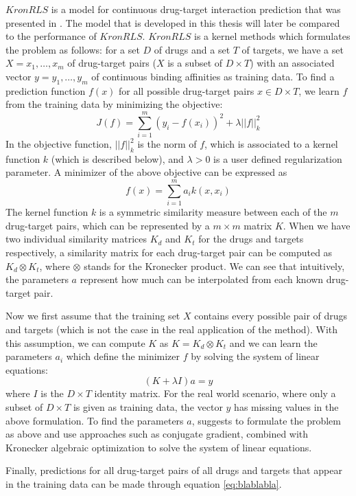 $KronRLS$ is a model for continuous drug-target interaction prediction that was presented in \cite{pahikkala2014toward}. The model that is developed in this thesis will later be compared to the performance of $KronRLS$. $KronRLS$ is a kernel methods which formulates the problem as follows:
for a set $D$ of drugs and a set $T$ of targets, we have a set $X = x_1,\dots,x_m$ of drug-target pairs ($X$ is a subset of $D\times T$) with an associated vector $y = y_1,\dots,y_m$ of continuous binding affinities as training data. To find a prediction function $f(x)$ for all possible drug-target pairs $x \in D\times T$, we learn $f$ from the training data by minimizing the objective:
\begin{equation}
J(f) = \sum\limits_{i=1}^{m}(y_i-f(x_i))^2 + \lambda ||f||_k^2
\end{equation}
In the objective function, $||f||_k^2$ is the norm of $f$, which is associated to a kernel function $k$ (which is described below), and $\lambda>0$ is a user defined regularization parameter. A minimizer of the above objective can be expressed as 
\begin{equation}
\label{eq:blablabla}
f(x)=\sum\limits_{i=1}^
{m} a_i k(x,x_i)
\end{equation}
The kernel function $k$ is a symmetric similarity measure between each of the $m$ drug-target pairs, which can be represented by a $m \times m$ matrix $K$. When we have two individual similarity matrices $K_d$ and $K_t$ for the drugs and targets respectively, a similarity matrix for each drug-target pair can be computed as \mbox{$K_d \otimes K_t$}, where $\otimes$ stands for the Kronecker product. We can see that intuitively, the parameters $a$ represent how much can be interpolated from each known drug-target pair.

Now we first assume that the training set $X$ contains every possible pair of drugs and targets (which is not the case in the real application of the method). With this assumption, we can compute $K$ as \mbox{$K = K_d \otimes K_t$} and we can learn the parameters $a_i$ which define the minimizer $f$ by solving the system of linear equations:
\begin{equation}
(K+\lambda I)a = y
\end{equation} where $I$ is the $D\times T$ identity matrix. 
For the real world scenario, where only a subset of $D\times T$ is given as training data, the vector $y$ has missing values in the above formulation. To find the parameters $a$,  \cite{pahikkala2014toward} suggests to formulate the problem as above and use approaches such as conjugate gradient, combined with Kronecker algebraic optimization to solve the system of linear equations.

Finally, predictions for all drug-target pairs of all drugs and targets that appear in the training data can be made through equation \ref{eq:blablabla}.



